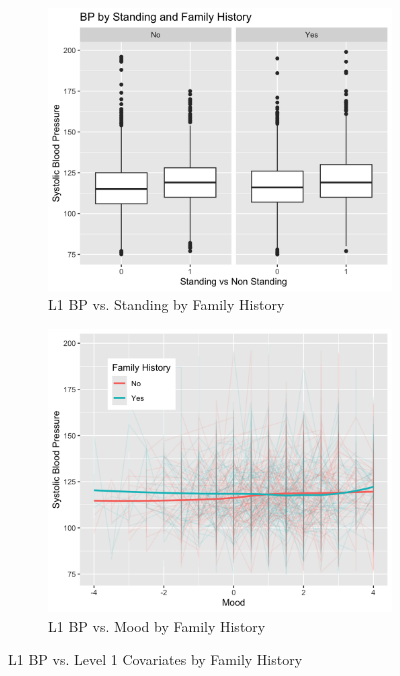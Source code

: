 \documentclass[12pt,twoside,leqno,fleqn,letterpaper]{article}
\theoremstyle{definition}
\theoremstyle{definition}
\begin{document}
\begin{figure}
    \begin{subfigure}{0.48\textwidth}
        \centering
        \includegraphics[width=\textwidth]{pics/bp v stand and fh.png}
        \caption{{\small L1 BP vs. Standing by Family History}}
        \label{fig: bp v stand and fh}
    \end{subfigure}
    \hfill
    \begin{subfigure}{0.48\textwidth}
        \centering
        \includegraphics[width=\textwidth]{pics/bp v mood and fh.png}
        \caption{{\small L1 BP vs. Mood by Family History}}
        \label{fig: bp v mood and fh}
    \end{subfigure}
    \caption{{\small L1 BP vs. Level 1 Covariates by Family History}}
    \label{fig: bp v level1 and fh2}
\end{figure}
\end{document}
